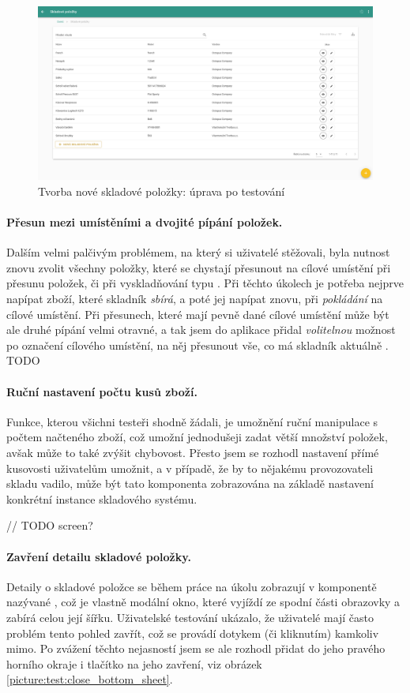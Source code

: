 \begin{figure}[h]
\includegraphics[width=\textwidth]{../png/app_testing/plus_after.png}
\caption{Tvorba nové skladové položky: úprava po testování} \label{picture:test:add_after}
\end{figure}


\paragraph{Přesun mezi umístěními a dvojité pípání položek.} Dalším velmi palčivým problémem, na který si uživatelé stěžovali, byla nutnost znovu zvolit všechny položky, které se chystají přesunout na cílové umístění při přesunu položek, či při vyskladňování typu . Při těchto úkolech je potřeba nejprve napípat zboží, které skladník \emph{sbírá}, a poté jej napípat znovu, při \emph{pokládání} na cílové umístění. Při přesunech, které mají pevně dané cílové umístění může být ale druhé pípání velmi otravné, a tak jsem do aplikace přidal \emph{volitelnou} možnost po označení cílového umístění, na něj přesunout vše, co má skladník aktuálně . 
TODO


\paragraph{Ruční nastavení počtu kusů zboží.} Funkce, kterou všichni testeři shodně žádali, je umožnění ruční manipulace s počtem načteného zboží, což umožní jednodušeji zadat větší množství položek, avšak může to také zvýšit chybovost. Přesto jsem se rozhodl nastavení přímé kusovosti uživatelům umožnit, a v případě, že by to nějakému provozovateli skladu vadilo, může být tato komponenta zobrazována na základě nastavení konkrétní instance skladového systému.

// TODO screen?

\paragraph{Zavření detailu skladové položky.} Detaily o skladové položce se během práce na úkolu zobrazují v komponentě nazývané , což je vlastně modální okno, které vyjíždí ze spodní části obrazovky a zabírá celou její šířku. Uživatelské testování ukázalo, že uživatelé mají často problém tento pohled zavřít, což se provádí dotykem (či kliknutím) kamkoliv mimo. Po zvážení těchto nejasností jsem se ale rozhodl přidat do jeho pravého horního okraje i tlačítko na jeho zavření, viz obrázek \ref{picture:test:close_bottom_sheet}.

